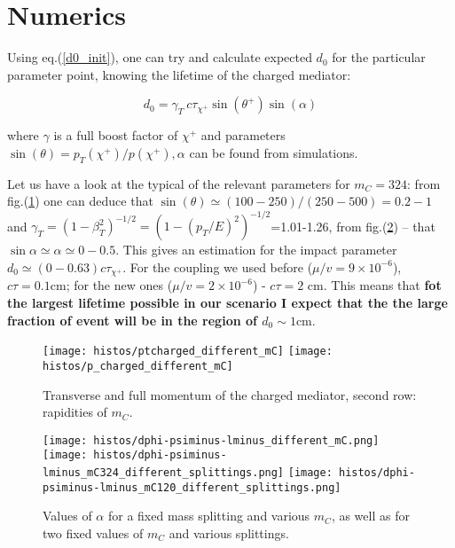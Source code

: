 \documentclass[12pt,letterpaper,notitlepage]{article}
\begin{document}
\section{Numerics}

Using eq.(\ref{d0_init}), one can try and calculate expected $d_0$ for the particular parameter point, knowing the lifetime of the charged mediator:

\begin{equation} \label{d0_lifetime}
  d_0= \gamma_T\ c \tau_{\chi^+} \sin(\theta^+) \sin (\alpha)
\end{equation}

where $\gamma$ is a full boost factor of $\chi^+$ and parameters $\sin(\theta)=p_T(\chi^+)/p(\chi^+), \alpha$ can be found from simulations.

Let us have a look at the typical of the relevant parameters for $m_C=324$: from fig.(\ref{fig:charged-kin}) one can deduce that $\sin(\theta) \simeq (100-250)/(250-500)=0.2-1$ and $\gamma_T=(1-\beta_T^2)^{-1/2}=(1-(p_T/E)^2)^{-1/2}$=1.01-1.26, from fig.(\ref{fig:alpha}) -- that $\sin \alpha \simeq \alpha \simeq 0-0.5$. This gives an estimation for the impact parameter $d_0 \simeq (0-0.63)c \tau_{\chi^+}$. For the coupling we used before ($\mu/v=9 \times 10^{-6}$), $c \tau = 0.1 \text{cm}$; for the new ones ($\mu/v=2 \times 10^{-6}$) - $c \tau = 2 \text{ cm}$. This means that \textbf{fot the largest lifetime possible in our scenario I expect that the the large fraction of event will be in the region of $d_0 \sim 1 \text{cm}$}.

\begin{figure}
\texttt{[image: histos/ptcharged\_different\_mC]}
\texttt{[image: histos/p\_charged\_different\_mC]}


\caption{\label{fig:charged-kin}Transverse and full momentum of the charged mediator, second row: rapidities of $m_C$.}
\end{figure}


\begin{figure}
\centering
\texttt{[image: histos/dphi-psiminus-lminus\_different\_mC.png]}\\
\texttt{[image: histos/dphi-psiminus-lminus\_mC324\_different\_splittings.png]}
\texttt{[image: histos/dphi-psiminus-lminus\_mC120\_different\_splittings.png]}

\caption{\label{fig:alpha}Values of $\alpha$ for a fixed mass splitting and various $m_C$, as well as for two fixed values of $m_C$ and various splittings.}
\end{figure}
\end{document}
